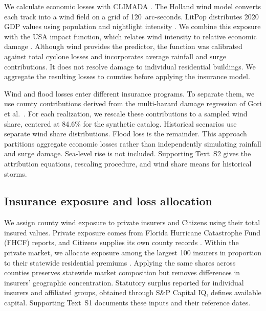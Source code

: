We calculate economic losses with CLIMADA \cite{aznar-siguan_climada_2019}. The Holland wind model \cite{holland_revised_2008} converts each track into a wind field on a grid of 120~arc-seconds. LitPop distributes 2020 GDP values using population and nightlight intensity \cite{eberenz_asset_2020}. We combine this exposure with the USA impact function, which relates wind intensity to relative economic damage \cite{eberenz_regional_2021}. Although wind provides the predictor, the function was calibrated against total cyclone losses and incorporates average rainfall and surge contributions. It does not resolve damage to individual residential buildings. We aggregate the resulting losses to counties before applying the insurance model.

Wind and flood losses enter different insurance programs. To separate them, we use county contributions derived from the multi-hazard damage regression of Gori et al.\ \cite{gori_sensitivity_2025,gori_tropical_2025}. For each realization, we rescale these contributions to a sampled wind share, centered at 84.6\% for the synthetic catalog. Historical scenarios use separate wind share distributions. Flood loss is the remainder. This approach partitions aggregate economic losses rather than independently simulating rainfall and surge damage. Sea-level rise is not included. Supporting Text~S2 gives the attribution equations, rescaling procedure, and wind share means for historical storms.

\subsection{Insurance exposure and loss allocation}\label{DataInsuranceMarket}\label{MethodsRiskAbsorption}
We assign county wind exposure to private insurers and Citizens using their total insured values. Private exposure comes from Florida Hurricane Catastrophe Fund (FHCF) reports, and Citizens supplies its own county records \cite{fhcf_coverage_2024,citizens_policies_in_force_2024}. Within the private market, we allocate exposure among the largest 100 insurers in proportion to their statewide residential premiums \cite{floir_marketshare_2024}. Applying the same shares across counties preserves statewide market composition but removes differences in insurers' geographic concentration. Statutory surplus reported for individual insurers and affiliated groups, obtained through S\&P Capital IQ, defines available capital. Supporting Text~S1 documents these inputs and their reference dates.


